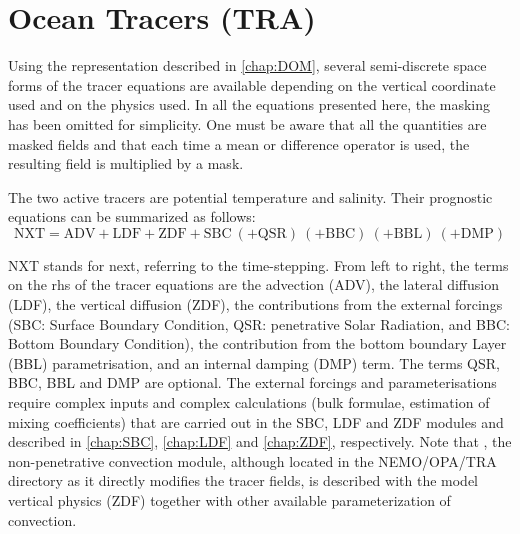 \documentclass[../main/NEMO_manual]{subfiles}
\begin{document}
\chapter{Ocean Tracers (TRA)}
\label{chap:TRA}

\minitoc




Using the representation described in \autoref{chap:DOM},
several semi-discrete space forms of the tracer equations are available depending on
the vertical coordinate used and on the physics used.
In all the equations presented here, the masking has been omitted for simplicity.
One must be aware that all the quantities are masked fields and
that each time a mean or difference operator is used,
the resulting field is multiplied by a mask.

The two active tracers are potential temperature and salinity.
Their prognostic equations can be summarized as follows:
\[
  \text{NXT} = \text{ADV}+\text{LDF}+\text{ZDF}+\text{SBC}
  \ (+\text{QSR})\ (+\text{BBC})\ (+\text{BBL})\ (+\text{DMP})
\]

NXT stands for next, referring to the time-stepping.
From left to right, the terms on the rhs of the tracer equations are the advection (ADV),
the lateral diffusion (LDF), the vertical diffusion (ZDF), the contributions from the external forcings
(SBC: Surface Boundary Condition, QSR: penetrative Solar Radiation, and BBC: Bottom Boundary Condition),
the contribution from the bottom boundary Layer (BBL) parametrisation, and an internal damping (DMP) term.
The terms QSR, BBC, BBL and DMP are optional.
The external forcings and parameterisations require complex inputs and complex calculations
(\eg bulk formulae, estimation of mixing coefficients) that are carried out in the SBC, LDF and ZDF modules and 
described in \autoref{chap:SBC}, \autoref{chap:LDF} and \autoref{chap:ZDF}, respectively.
Note that , the non-penetrative convection module, although located in the NEMO/OPA/TRA directory as
it directly modifies the tracer fields, is described with the model vertical physics (ZDF) together with
other available parameterization of convection.
\end{document}

